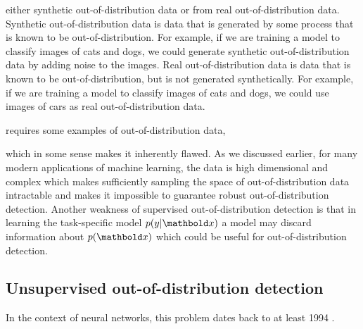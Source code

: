 

\cite{hendrycks_baseline_2017, lakshminarayanan_simple_2017, lliang_enhancing_2018, lee_simple_2018, huang_importance_2021, wang_vim_2022}




 either synthetic out-of-distribution data or from real out-of-distribution data. Synthetic out-of-distribution data is data that is generated by some process that is known to be out-of-distribution. For example, if we are training a model to classify images of cats and dogs, we could generate synthetic out-of-distribution data by adding noise to the images. Real out-of-distribution data is data that is known to be out-of-distribution, but is not generated synthetically. For example, if we are training a model to classify images of cats and dogs, we could use images of cars as real out-of-distribution data.

 requires some examples of out-of-distribution data, 

 which in some sense makes it inherently flawed. As we discussed earlier, for many modern applications of machine learning, the data is high dimensional and complex which makes sufficiently sampling the space of out-of-distribution data intractable and makes it impossible to guarantee robust out-of-distribution detection. Another weakness of supervised out-of-distribution detection is that in learning the task-specific model $p(y|\xb)$ a model may discard information about $p(\xb)$ which could be useful for out-of-distribution detection.


 \subsection{Unsupervised out-of-distribution detection}

In the context of neural networks, this problem dates back to at least 1994 \cite{bishop_novelty_1994}. 


